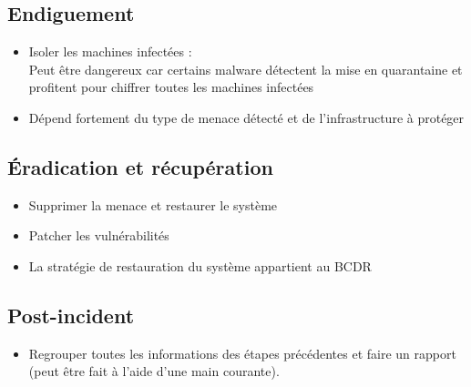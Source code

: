 \documentclass[a4paper]{article}
\begin{document}
\subsection{Endiguement}
\begin{itemize}[label=\textbullet, font=\Large]
    \item Isoler les machines infectées :\\
    Peut être dangereux car certains malware détectent la mise en quarantaine et profitent pour chiffrer toutes les machines infectées
    \item Dépend fortement du type de menace détecté et de l'infrastructure à protéger
\end{itemize}

\subsection{Éradication et récupération}
\begin{itemize}[label=\textbullet, font=\Large]
    \item Supprimer la menace et restaurer le système
    \item Patcher les vulnérabilités
    \item La stratégie de restauration du système appartient au BCDR
\end{itemize}

\subsection{Post-incident}
\begin{itemize}[label=\textbullet, font=\Large]
    \item Regrouper toutes les informations des étapes précédentes et faire un rapport (peut être fait à l'aide d'une main courante).
\end{itemize}
\newpage
\end{document}
